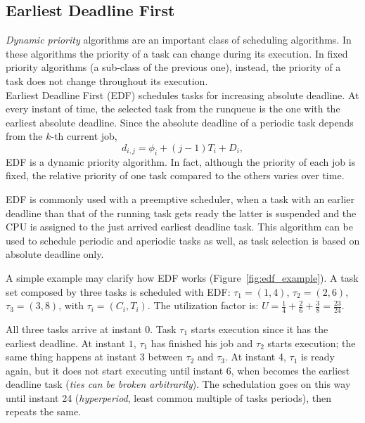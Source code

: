 \subsection{Earliest Deadline First\label{sec:EDFCBS_EDF}}

\emph{Dynamic priority} algorithms are an important class of scheduling
algorithms. In these algorithms the priority of a task can change during
its execution. In fixed priority algorithms (a sub-class of the previous one),
instead, the priority of a task does not change throughout its execution.\\
Earliest Deadline First (EDF) schedules tasks for increasing absolute deadline.
At every instant of time, the selected task from the runqueue is the one with
the earliest absolute deadline. Since the absolute deadline of a periodic task
depends from the $k$-th current job,
$$
d_{i,j} = \phi_{i} + (j -1)T_{i} + D_{i},
$$
EDF is a dynamic priority algorithm. In fact, although the priority of
each job is fixed, the relative priority of one task compared to the
others varies over time.

EDF is commonly used with a preemptive scheduler, when a task with an
earlier deadline than that of the running task gets ready the latter
is suspended and the CPU is assigned to the just arrived earliest
deadline task. This algorithm can be used to schedule periodic and
aperiodic tasks as well, as task selection is based on absolute
deadline only.

A simple example may clarify how EDF works
(Figure~\ref{fig:edf_example}). A task set composed by three tasks is
scheduled with EDF: $\tau_{1} = (1,4)$, $\tau_{2} = (2,6)$, $\tau_{3}
= (3,8)$, with $\tau_{i} = (C_{i},T_{i})$.  The utilization factor is:
$U = \frac{1}{4} + \frac{2}{6} + \frac{3}{8} =
\frac{23}{24}$.

All three tasks arrive at instant $0$. Task $\tau_{1}$ starts
execution since it has the earliest deadline. At instant $1$,
$\tau_{1}$ has finished his job and $\tau_{2}$ starts execution; the
same thing happens at instant $3$ between $\tau_{2}$ and
$\tau_{3}$. At instant 4, $\tau_{1}$ is ready again, but it does not
start executing until instant 6, when becomes the earliest deadline
task (\emph{ties can be broken arbitrarily}). The schedulation goes on
this way until instant 24 (\emph{hyperperiod}, least common multiple
of tasks periods), then repeats the same.

